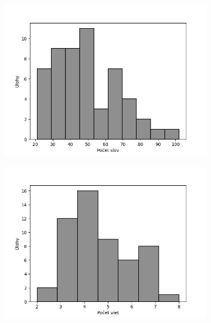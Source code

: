 \begin{figure}[h]
\centering
\begin{subfigure}[b]{0.32\textwidth}
\centering
\includegraphics[width=\textwidth]{assets/words.png}
\end{subfigure}
\hfill
\begin{subfigure}[b]{0.32\textwidth}
\centering
\includegraphics[width=\textwidth]{assets/sentences.png}
\end{subfigure}
\hfill
\begin{subfigure}[b]{0.32\textwidth}
\centering

\end{subfigure}
\end{figure}

